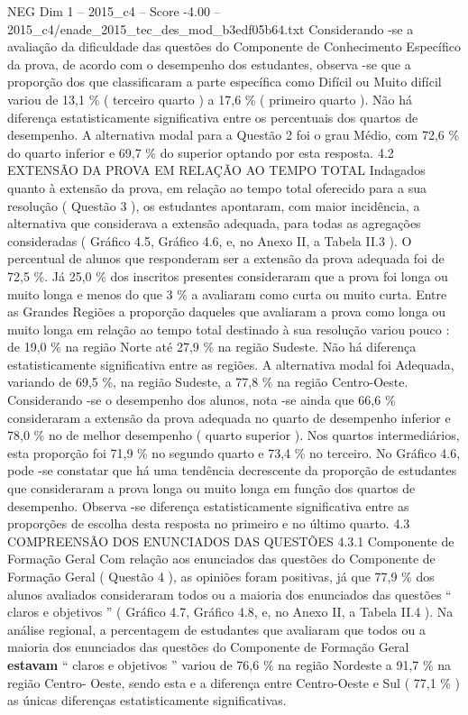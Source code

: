 \begin{textsample}{NEG Dim 1 – 2015\_c4 – Score -4.00 – 2015\_c4/enade\_2015\_tec\_des\_mod\_b3edf05b64.txt}
Considerando -se a avaliação da dificuldade das questões do Componente de Conhecimento Específico da prova, de acordo com o desempenho dos estudantes, observa -se que a proporção dos que classificaram a parte específica como Difícil ou Muito difícil variou de 13,1 \% ( terceiro quarto ) a 17,6 \% ( primeiro quarto ).
Não há diferença estatisticamente significativa entre os percentuais dos quartos de desempenho.
A alternativa modal para a Questão 2 foi o grau Médio, com 72,6 \% do quarto inferior e 69,7 \% do superior optando por esta resposta. 4.2 EXTENSÃO DA PROVA EM RELAÇÃO AO TEMPO TOTAL Indagados quanto à extensão da prova, em relação ao tempo total oferecido para a sua resolução ( Questão 3 ), os estudantes apontaram, com maior incidência, a alternativa que considerava a extensão adequada, para todas as agregações consideradas ( Gráfico 4.5, Gráfico 4.6, e, no Anexo II, a Tabela II.3 ).
O percentual de alunos que responderam ser a extensão da prova adequada foi de 72,5 \%.
Já 25,0 \% dos inscritos presentes consideraram que a prova foi longa ou muito longa e menos do que 3 \% a avaliaram como curta ou muito curta.
Entre as Grandes Regiões a proporção daqueles que avaliaram a prova como longa ou muito longa em relação ao tempo total destinado à sua resolução variou pouco : de 19,0 \% na região Norte até 27,9 \% na região Sudeste.
Não há diferença estatisticamente significativa entre as regiões.
A alternativa modal foi Adequada, variando de 69,5 \%, na região Sudeste, a 77,8 \% na região Centro-Oeste.
Considerando -se o desempenho dos alunos, nota -se ainda que 66,6 \% consideraram a extensão da prova adequada no quarto de desempenho inferior e 78,0 \% no de melhor desempenho ( quarto superior ).
Nos quartos intermediários, esta proporção foi 71,9 \% no segundo quarto e 73,4 \% no terceiro.
No Gráfico 4.6, pode -se constatar que há uma tendência decrescente da proporção de estudantes que consideraram a prova longa ou muito longa em função dos quartos de desempenho.
Observa -se diferença estatisticamente significativa entre as proporções de escolha desta resposta no primeiro e no último quarto. 4.3 COMPREENSÃO DOS ENUNCIADOS DAS QUESTÕES 4.3.1 Componente de Formação Geral Com relação aos enunciados das questões do Componente de Formação Geral ( Questão 4 ), as opiniões foram positivas, já que 77,9 \% dos alunos avaliados consideraram todos ou a maioria dos enunciados das questões “ claros e objetivos ” ( Gráfico 4.7, Gráfico 4.8, e, no Anexo II, a Tabela II.4 ).
Na análise regional, a percentagem de estudantes que avaliaram que todos ou a maioria dos enunciados das questões do Componente de Formação Geral \textbf{estavam} “ claros e objetivos ” variou de 76,6 \% na região Nordeste a 91,7 \% na região Centro- Oeste, sendo esta e a diferença entre Centro-Oeste e Sul ( 77,1 \% ) as únicas diferenças estatisticamente significativas.

\end{textsample}

